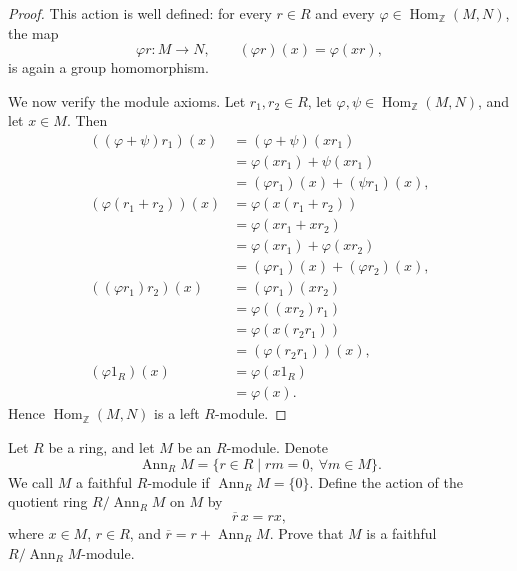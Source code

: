 \begin{proof}
    This action is well defined: for every $r \in R$ and every $\varphi \in \operatorname{Hom}_{\mathbb{Z}}(M,N)$, the map
    \[
        \varphi r\colon M \to N, \qquad (\varphi r)(x)=\varphi(xr),
    \]
    is again a group homomorphism.

    We now verify the module axioms. Let $r_1, r_2 \in R$, let $\varphi,\psi \in \operatorname{Hom}_{\mathbb{Z}}(M,N)$, and let $x \in M$. Then
    \begin{align*}
        ((\varphi+\psi)r_1)(x)
         & = (\varphi+\psi)(xr_1)               \\
         & = \varphi(xr_1)+\psi(xr_1)           \\
         & = (\varphi r_1)(x)+(\psi r_1)(x),    \\
        (\varphi(r_1+r_2))(x)
         & = \varphi(x(r_1+r_2))                \\
         & = \varphi(xr_1+xr_2)                 \\
         & = \varphi(xr_1)+\varphi(xr_2)        \\
         & = (\varphi r_1)(x)+(\varphi r_2)(x), \\
        ((\varphi r_1)r_2)(x)
         & = (\varphi r_1)(xr_2)                \\
         & = \varphi((xr_2)r_1)                 \\
         & = \varphi(x(r_2r_1))                 \\
         & = (\varphi(r_2r_1))(x),              \\
        (\varphi 1_R)(x)
         & = \varphi(x1_R)                      \\
         & = \varphi(x).
    \end{align*}
    Hence $\operatorname{Hom}_{\mathbb{Z}}(M,N)$ is a left $R$-module.
\end{proof}

\begin{exercise}
    Let $R$ be a ring, and let $M$ be an $R$-module. Denote
    \[
        \operatorname{Ann}_R M=\{r\in R \mid rm=0,\ \forall m\in M\}.
    \]
    We call $M$ a faithful $R$-module if $\operatorname{Ann}_R M=\{0\}$. Define the action
    of the quotient ring $R/\operatorname{Ann}_R M$ on $M$ by
    \[
        \overline{r}\,x=rx,
    \]
    where $x\in M$, $r\in R$, and $\overline{r}=r+\operatorname{Ann}_R M$. Prove that $M$ is a faithful $R/\operatorname{Ann}_R M$-module.
\end{exercise}

